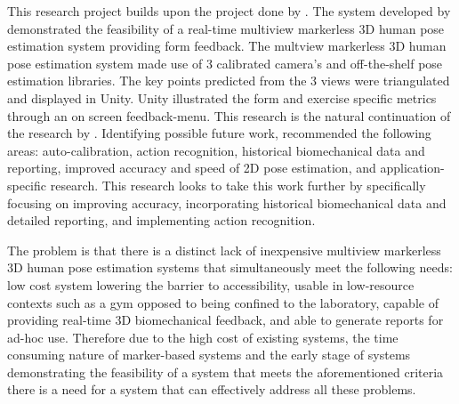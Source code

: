 This research project builds upon the project done by \citet{steyn2024markerless}.
The system developed by \citet{steyn2024markerless} demonstrated the feasibility of a real-time multiview markerless 3D human pose estimation system providing form feedback. The multview markerless 3D human pose estimation system made use of 3 calibrated camera's and off-the-shelf pose estimation libraries. The key points predicted from the 3 views were triangulated and displayed in Unity. Unity illustrated the form and exercise specific metrics through an on screen feedback-menu. This research is the natural continuation of the research by \citet{steyn2024markerless}. Identifying possible future work, \citet{steyn2024markerless} recommended the following areas: auto-calibration, action recognition, historical biomechanical data and reporting, improved accuracy and speed of 2D pose estimation, and application-specific research. 
This research looks to take this work further by specifically focusing on improving accuracy, incorporating historical biomechanical data and detailed reporting, and implementing action recognition.

\label{sec:problemstatement}

The problem is that there is a distinct lack of inexpensive multiview markerless 3D human pose estimation systems that simultaneously meet the following needs: low cost system lowering the barrier to accessibility, usable in low-resource contexts such as a gym opposed to being confined to the laboratory, capable of providing real-time 3D biomechanical feedback, and able to generate reports for ad-hoc use. Therefore due to the high cost of existing systems, the time consuming nature of marker-based systems and the early stage of systems demonstrating the feasibility of a system that meets the aforementioned criteria there is a need for a system that can effectively address all these problems.




